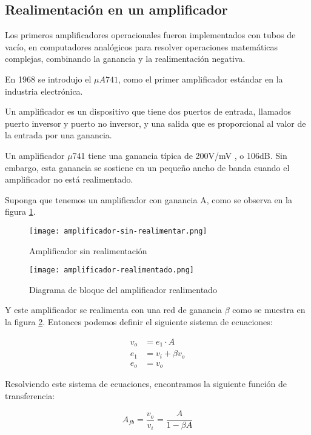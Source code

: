 \subsection{Realimentación en un amplificador}
Los primeros amplificadores operacionales fueron implementados con tubos de vacío, en computadores analógicos para resolver operaciones matemáticas complejas, combinando la ganancia y la realimentación negativa.

En 1968 se introdujo el $\mu A741$, como el primer amplificador estándar en la industria electrónica.

Un amplificador es un dispositivo que tiene dos puertos de entrada, llamados puerto inversor y puerto no inversor, y una salida que es proporcional
al valor de la entrada por una ganancia.

Un amplificador $\mu$741 tiene una ganancia típica de 200V/mV , o 106dB. Sin embargo, esta ganancia se sostiene en un pequeño ancho de banda cuando el amplificador no está realimentado.

Suponga que tenemos un amplificador con ganancia A, como se observa
en la figura \ref{fig:mt-amplificador-sin-realimentar}.

\begin{figure}[ht]
    \centering
    \texttt{[image: amplificador-sin-realimentar.png]}
    \caption{Amplificador sin realimentación}
    \label{fig:mt-amplificador-sin-realimentar}
\end{figure}

\begin{figure}[ht]
    \centering
    \texttt{[image: amplificador-realimentado.png]}
    \caption{Diagrama de bloque del amplificador realimentado}
    \label{fig:mt-amplificador-realimentado}
\end{figure}

Y este amplificador se realimenta con una red de ganancia $\beta$ como se muestra en la figura \ref{fig:mt-amplificador-realimentado}. Entonces podemos definir el siguiente sistema de ecuaciones:

\begin{align*}
    v_o & = e_1 \cdot A \\
    e_1 & = v_i + \beta v_o \\
    e_o & = v_o
\end{align*}

Resolviendo este sistema de ecuaciones, encontramos la siguiente función de transferencia:

\begin{equation}
    \boxed{A_{fb} = \frac{v_o}{v_i} = \frac{A}{1 - \beta A}}
    \label{eq:mt-func-transferencia-realimentacion}
\end{equation}

